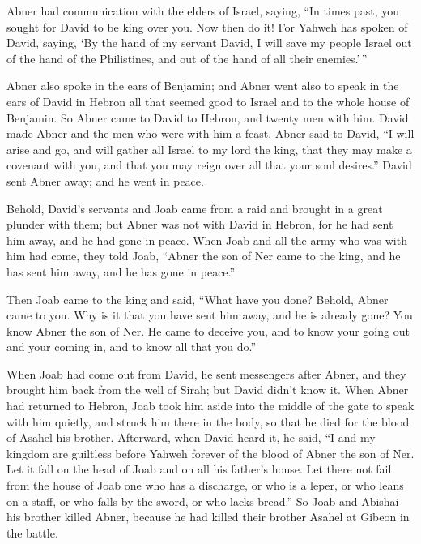  Abner had communication with the elders of Israel,
saying, ``In times past, you sought for David to be king over you.
 Now then do it! For Yahweh has spoken of David, saying,
`By the hand of my servant David, I will save my people Israel out of
the hand of the Philistines, and out of the hand of all their
enemies.'\,''

 Abner also spoke in the ears of Benjamin; and Abner went
also to speak in the ears of David in Hebron all that seemed good to
Israel and to the whole house of Benjamin.  So Abner came
to David to Hebron, and twenty men with him. David made Abner and the
men who were with him a feast.  Abner said to David, ``I
will arise and go, and will gather all Israel to my lord the king, that
they may make a covenant with you, and that you may reign over all that
your soul desires.'' David sent Abner away; and he went in peace.

 Behold, David's servants and Joab came from a raid and
brought in a great plunder with them; but Abner was not with David in
Hebron, for he had sent him away, and he had gone in peace.
 When Joab and all the army who was with him had come,
they told Joab, ``Abner the son of Ner came to the king, and he has sent
him away, and he has gone in peace.''

 Then Joab came to the king and said, ``What have you
done? Behold, Abner came to you. Why is it that you have sent him away,
and he is already gone?  You know Abner the son of Ner.
He came to deceive you, and to know your going out and your coming in,
and to know all that you do.''

 When Joab had come out from David, he sent messengers
after Abner, and they brought him back from the well of Sirah; but David
didn't know it.  When Abner had returned to Hebron, Joab
took him aside into the middle of the gate to speak with him quietly,
and struck him there in the body, so that he died for the blood of
Asahel his brother.  Afterward, when David heard it, he
said, ``I and my kingdom are guiltless before Yahweh forever of the
blood of Abner the son of Ner.  Let it fall on the head
of Joab and on all his father's house. Let there not fail from the house
of Joab one who has a discharge, or who is a leper, or who leans on a
staff, or who falls by the sword, or who lacks bread.'' 
So Joab and Abishai his brother killed Abner, because he had killed
their brother Asahel at Gibeon in the battle.

